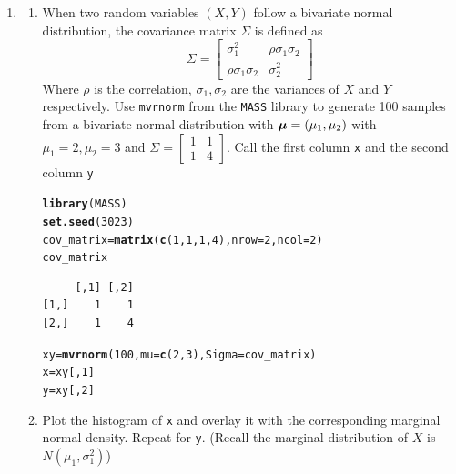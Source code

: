 \documentclass[12pt, a4paper]{article}\usepackage[]{graphicx}\usepackage[]{color}
\makeatletter
\newcommand{\hlnum}[1]{\textcolor[rgb]{0.686,0.059,0.569}{#1}}%
\newcommand{\hlstd}[1]{\textcolor[rgb]{0.345,0.345,0.345}{#1}}%
\newcommand{\hlkwb}[1]{\textcolor[rgb]{0.69,0.353,0.396}{#1}}%
\newcommand{\hlkwc}[1]{\textcolor[rgb]{0.333,0.667,0.333}{#1}}%
\newcommand{\hlkwd}[1]{\textcolor[rgb]{0.737,0.353,0.396}{\textbf{#1}}}%
\newenvironment{kframe}{%
 \def\at@end@of@kframe{}%
 \ifinner\ifhmode%
  \def\at@end@of@kframe{\end{minipage}}%
  \begin{minipage}{\columnwidth}%
 \fi\fi%
 \def\FrameCommand##1{\hskip\@totalleftmargin \hskip-\fboxsep
 \colorbox{shadecolor}{##1}\hskip-\fboxsep
     \hskip-\linewidth \hskip-\@totalleftmargin \hskip\columnwidth}%
 \MakeFramed {\advance\hsize-\width
   \@totalleftmargin\z@ \linewidth\hsize
   \@setminipage}}%
 {\par\unskip\endMakeFramed%
 \at@end@of@kframe}
\newenvironment{knitrout}{}{} %
\makeatother
\begin{document}
\begin{enumerate}
\begin{enumerate}
{      }
    \end{enumerate}
    \item 
    \begin{enumerate}
    \item When two random variables $(X, Y)$ follow a bivariate normal distribution, the
covariance matrix $\Sigma$ is defined as
$$ \Sigma = \begin{bmatrix} \sigma_1^2 & \rho\sigma_1\sigma_2 \\
\rho\sigma_1\sigma_2 & \sigma_2^2\end{bmatrix}$$
Where $\rho$ is the correlation, $\sigma_1, \sigma_2$ are the variances of $X$ and $Y$ respectively. Use \verb+mvrnorm+ from the \verb+MASS+ library to generate 100 samples
from a bivariate normal distribution with $\boldsymbol{\mu} = \left(\mu_1, \mu_2\right)$ with $\mu_1 = 2, \mu_2 = 3$ and $\Sigma = \begin{bmatrix} 1 & 1\\1 & 4\end{bmatrix}$. Call the first column \verb+x+ and the second column \verb+y+
\begin{knitrout}\scriptsize
{}\color{fgcolor}\begin{kframe}
\begin{alltt}
\hlkwd{library}\hlstd{(MASS)}
\hlkwd{set.seed}\hlstd{(}\hlnum{3023}\hlstd{)}
\hlstd{cov_matrix} \hlkwb{=} \hlkwd{matrix}\hlstd{(}\hlkwd{c}\hlstd{(}\hlnum{1}\hlstd{,} \hlnum{1}\hlstd{,} \hlnum{1}\hlstd{,} \hlnum{4}\hlstd{),} \hlkwc{nrow} \hlstd{=} \hlnum{2}\hlstd{,} \hlkwc{ncol} \hlstd{=} \hlnum{2}\hlstd{)}
\hlstd{cov_matrix}
\end{alltt}
\begin{verbatim}
     [,1] [,2]
[1,]    1    1
[2,]    1    4
\end{verbatim}
\begin{alltt}
\hlstd{xy} \hlkwb{=} \hlkwd{mvrnorm}\hlstd{(}\hlnum{100}\hlstd{,} \hlkwc{mu} \hlstd{=} \hlkwd{c}\hlstd{(}\hlnum{2}\hlstd{,} \hlnum{3}\hlstd{),} \hlkwc{Sigma} \hlstd{= cov_matrix)}
\hlstd{x} \hlkwb{=} \hlstd{xy[ ,} \hlnum{1}\hlstd{]}
\hlstd{y} \hlkwb{=} \hlstd{xy[ ,} \hlnum{2}\hlstd{]}
\end{alltt}
\end{kframe}
\end{knitrout}
    \item Plot the histogram of \verb+x+ and overlay it with the corresponding marginal normal
density. Repeat for \verb+y+. (Recall the marginal distribution of $X$ is $N(\mu_1, \sigma_1^2)$)

\end{enumerate}
\end{enumerate}
\end{document}
